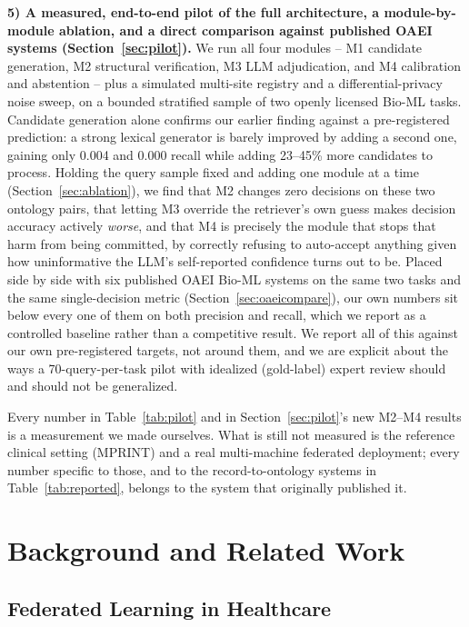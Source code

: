 \documentclass[conference]{IEEEtran}
\begin{document}
\textbf{5) A measured, end-to-end pilot of the full architecture, a module-by-module ablation, and a direct comparison against published OAEI systems (Section~\ref{sec:pilot}).} We run all four modules -- M1 candidate generation, M2 structural verification, M3 LLM adjudication, and M4 calibration and abstention -- plus a simulated multi-site registry and a differential-privacy noise sweep, on a bounded stratified sample of two openly licensed Bio-ML tasks. Candidate generation alone confirms our earlier finding against a pre-registered prediction: a strong lexical generator is barely improved by adding a second one, gaining only 0.004 and 0.000 recall while adding 23--45\% more candidates to process. Holding the query sample fixed and adding one module at a time (Section~\ref{sec:ablation}), we find that M2 changes zero decisions on these two ontology pairs, that letting M3 override the retriever's own guess makes decision accuracy actively \emph{worse}, and that M4 is precisely the module that stops that harm from being committed, by correctly refusing to auto-accept anything given how uninformative the LLM's self-reported confidence turns out to be. Placed side by side with six published OAEI Bio-ML systems on the same two tasks and the same single-decision metric (Section~\ref{sec:oaeicompare}), our own numbers sit below every one of them on both precision and recall, which we report as a controlled baseline rather than a competitive result. We report all of this against our own pre-registered targets, not around them, and we are explicit about the ways a 70-query-per-task pilot with idealized (gold-label) expert review should and should not be generalized.

Every number in Table~\ref{tab:pilot} and in Section~\ref{sec:pilot}'s new M2--M4 results is a measurement we made ourselves. What is still not measured is the reference clinical setting (MPRINT) and a real multi-machine federated deployment; every number specific to those, and to the record-to-ontology systems in Table~\ref{tab:reported}, belongs to the system that originally published it.

\section{Background and Related Work}
\label{sec:related}

\subsection{Federated Learning in Healthcare}
\end{document}
